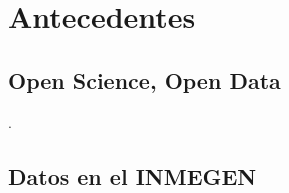 \documentclass[
10pt, %
letterpaper, %
oneside, %
headinclude,footinclude, %
BCOR5mm, %
]{scrartcl}
\title{\normalfont\spacedallcaps{Banco de Datos INMEGEN}}
\author{\spacedlowsmallcaps{Rodrigo García Herrera}}
\date{} %
\begin{document}

\renewcommand{\sectionmark}[1]{\markright{\spacedlowsmallcaps{#1}}} %
\lehead{\mbox{\llap{\small\thepage\kern1em\color{halfgray} \vline}\color{halfgray}\hspace{0.5em}\rightmark\hfil}} %

\pagestyle{scrheadings} %



\maketitle %
\setcounter{tocdepth}{2} %
\tableofcontents %




\section{Antecedentes}


\subsection{Open Science, Open Data}
\cite{molloy_open_2011}.
\cite{walport_sharing_2011}
\cite{piwowar_sharing_2007}
\cite{alsheikh-ali_public_2011}
\cite{wicherts_poor_2006}
\cite{wicherts_publish_2012}
\cite{wicherts_willingness_2011}

\subsection{Datos en el INMEGEN}
\end{document}
